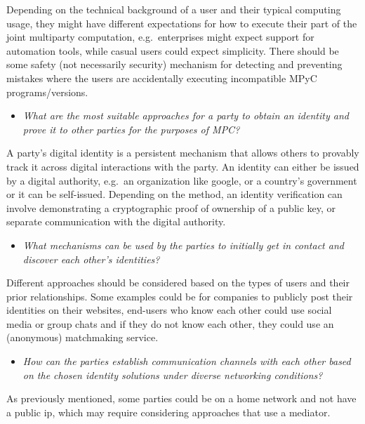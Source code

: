Depending on the technical background of a user and their typical
computing usage, they might have different expectations for how to
execute their part of the joint multiparty computation, e.g.~enterprises
might expect support for automation tools, while casual users could
expect simplicity. There should be some safety (not necessarily
security) mechanism for detecting and preventing mistakes where the
users are accidentally executing incompatible MPyC programs/versions.

\begin{itemize}
\tightlist
\item
  \emph{What are the most suitable approaches for a party to obtain an
  identity and prove it to other parties for the purposes of MPC?}
\end{itemize}

A party's digital identity is a persistent mechanism that allows others
to provably track it across digital interactions with the party. An
identity can either be issued by a digital authority, e.g.~an
organization like google, or a country's government or it can be
self-issued. Depending on the method, an identity verification can
involve demonstrating a cryptographic proof of ownership of a public
key, or separate communication with the digital authority.

\begin{itemize}
\tightlist
\item
  \emph{What mechanisms can be used by the parties to initially get in
  contact and discover each other's identities?}
\end{itemize}

Different approaches should be considered based on the types of users
and their prior relationships. Some examples could be for companies to
publicly post their identities on their websites, end-users who know
each other could use social media or group chats and if they do not know
each other, they could use an (anonymous) matchmaking service.

\begin{itemize}
\tightlist
\item
  \emph{How can the parties establish communication channels with each
  other based on the chosen identity solutions under diverse networking
  conditions?}
\end{itemize}

As previously mentioned, some parties could be on a home network and not
have a public \gls{ip}, which may require considering approaches that
use a mediator.

